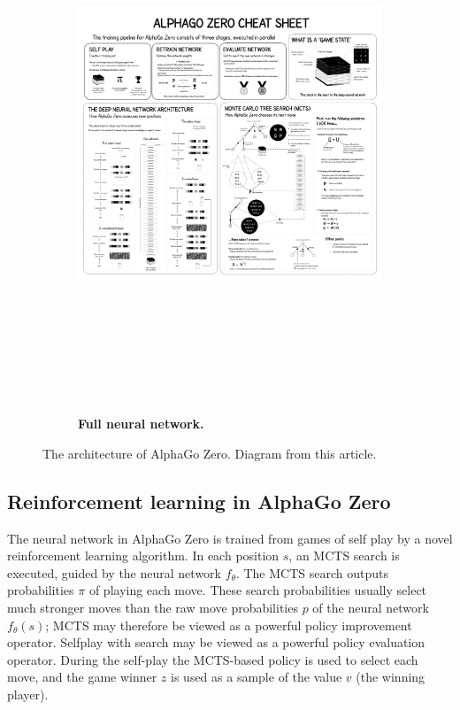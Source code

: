 \documentclass{article}
\begin{document}
\begin{figure}[H]\ContinuedFloat
	\begin{subfigure}{1\textwidth}
		\centering
		\includegraphics[height=16cm,angle=90,trim={1600px 243px 5916px 3678px},clip]{alpha_go_zero_cheat_sheet.png}
		\caption{\textbf{Full neural network.}}
		\label{fig:arch_full}
	\end{subfigure}
	\caption[Caption for LOF]{The architecture of AlphaGo Zero. Diagram from this article.\footnotemark}
\end{figure}


\subsection{Reinforcement learning in AlphaGo Zero}
The neural network in AlphaGo Zero is trained from games of self­ play by a novel reinforcement learning algorithm. In each position $s$, an MCTS search is executed, guided by the neural network $f_\theta$. The MCTS search outputs probabilities $\pi$ of playing each move. These search probabilities usually select much stronger moves than the raw move probabilities $p$ of the neural network $f_\theta(s)$; MCTS may therefore be viewed as a powerful policy improvement operator. Self­play with search may be viewed as a powerful policy evaluation operator. During the self-play the MCTS-based policy is used to select each move, and the game winner $z$ is used as a sample of the value $v$ (the winning player).
\end{document}
